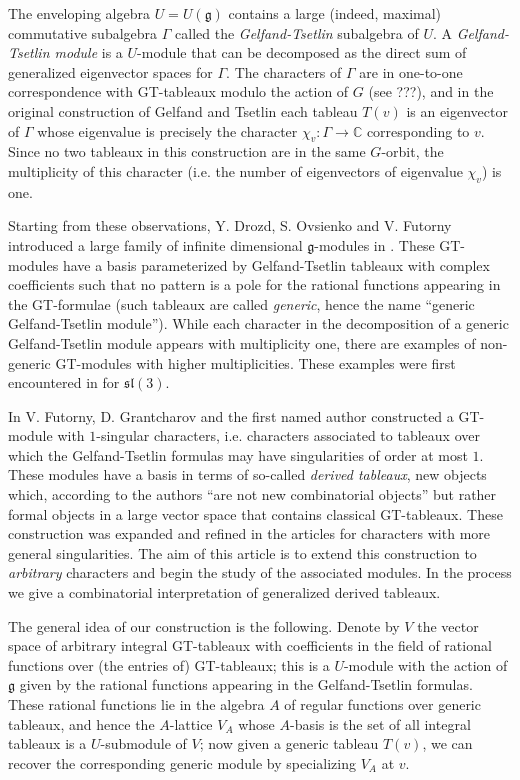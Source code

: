 \documentclass[11pt,fleqn]{article}
\newcounter{para}[section]
\newcommand\CC{\mathbb C}
\renewcommand\to{\longrightarrow}
\newcommand\g{\mathfrak g}
\begin{document}
The enveloping algebra $U = U(\g)$ contains a large (indeed, maximal) 
commutative subalgebra $\Gamma$ called the \emph{Gelfand-Tsetlin} subalgebra 
of $U$. A \emph{Gelfand-Tsetlin module} is a $U$-module that can be
decomposed as the direct sum of generalized eigenvector spaces for $\Gamma$.
The characters of $\Gamma$ are in one-to-one correspondence with GT-tableaux modulo the action of $G$ (see \cite{Zh}???), and in the original construction of Gelfand and 
Tsetlin each tableau $T(v)$ is an eigenvector of $\Gamma$ whose eigenvalue is precisely the character $\chi_v: \Gamma \to \CC$ corresponding to $v$. Since no two tableaux in this construction are in the same $G$-orbit, the multiplicity of this character (i.e. the number of eigenvectors
of eigenvalue $\chi_v$) is one.

Starting from these observations, Y. Drozd, S. Ovsienko and V. Futorny 
introduced a large family of infinite dimensional $\g$-modules in 
\cite{DFO-GT-modules}. These GT-modules have a basis parameterized by Gelfand-Tsetlin tableaux with complex coefficients such that no pattern is a pole for the rational functions appearing in the GT-formulae (such tableaux 
are called \emph{generic}, hence the name ``generic Gelfand-Tsetlin module''). 
While each character in the decomposition of a generic Gelfand-Tsetlin module
appears with multiplicity one, there are examples of non-generic GT-modules
with higher multiplicities. These examples were first encountered in \cites{Fut1, Fut2} for $\mathfrak{sl}(3)$.

In \cite{FGR-1-singular} V. Futorny, D. Grantcharov and the first named author
constructed a GT-module with $1$-singular characters, i.e. characters 
associated to tableaux over which the Gelfand-Tsetlin formulas may have 
singularities of order at most $1$. These modules have a basis in terms of 
so-called \emph{derived tableaux}, new objects which, according to the authors 
``are not new combinatorial objects'' but rather formal objects in a large
vector space that contains classical GT-tableaux. These construction was 
expanded and refined in the articles \cites{FGR-2-index, Zad-1-sing, 
V-geometric-singular-GT} for characters with more general singularities. The 
aim of this article is to extend this construction to \emph{arbitrary} 
characters and begin the study of the associated modules. In the process we 
give a combinatorial interpretation of generalized derived tableaux.

The general idea of our construction is the following. Denote by $V$ the vector
space of arbitrary integral GT-tableaux with coefficients in the field of 
rational functions over (the entries of) GT-tableaux; this is a $U$-module 
with the action of $\g$ given by the rational functions appearing in the 
Gelfand-Tsetlin formulas. These rational functions lie in the algebra $A$ of 
regular functions over generic tableaux, and hence the $A$-lattice $V_A$ whose 
$A$-basis is the set of all integral tableaux is a $U$-submodule of $V$; now 
given a generic tableau $T(v)$, we can recover the corresponding generic module by specializing $V_A$ at $v$.
\end{document}
